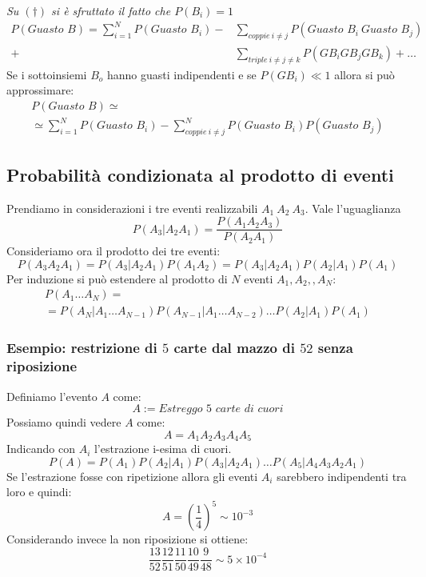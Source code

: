 \documentclass[11pt,a4paper]{book}
\begin{document}
\begin{itemize}
\textit{Su $ (\dag) $ si è sfruttato il fatto che $ P(B_i)=1 $}
\begin{align}
P(\textit{Guasto }B)  = \sum\limits_{i = 1}^{N} P(\textit{Guasto }B_i) -& \sum\limits_{coppie \ i \neq j} P(\textit{Guasto }B_i \ \textit{Guasto }B_j) \\
+& \sum\limits_{triple \ i \neq j \neq k}P(GB_i GB_j GB_k)+ \dots
\end{align}
Se i sottoinsiemi $ B_o $ hanno guasti indipendenti e se $ P(GB_i)\ll1 $ allora si può approssimare:
\begin{multline}
P(\textit{Guasto }B)\simeq \\ \simeq \sum\limits_{i = 1}^{N} P(\textit{Guasto }B_i) - \sum\limits_{coppie \ i \neq j}^{N} P(\textit{Guasto }B_i) P(\textit{Guasto }B_j)
\end{multline}
\end{itemize}
\subsection{Probabilità condizionata al prodotto di eventi} 
Prendiamo in considerazioni i tre eventi realizzabili $ A_1 \ A_2 \ A_3$. Vale l'uguaglianza
\begin{equation}
P(A_3 | A_2 A_1) = \frac{P(A_1 A_2 A_3)}{P(A_2 A_1)}
\end{equation}
Consideriamo ora il prodotto dei tre eventi:
\begin{equation}
P(A_3A_2A_1) = P(A_3 | A_2 A_1) P(A_1A_2) = P(A_3 | A_2 A_1)P(A_2|A_1)P(A_1)
\end{equation}
Per induzione si può estendere al prodotto di $ N $ eventi $ A_1, A_2  ,, A_N $:
\begin{multline}
P(A_1 \dots A_N) =\\
= P(A_N | A_1 \dots A_{N-1})P(A_{N-1}|A_1 \dots A_{N-2})\dots P(A_2|A_1) P(A_1)
\end{multline}
\subsubsection{Esempio: restrizione di $ 5 $ carte dal mazzo di $ 52 $ senza riposizione}
Definiamo l'evento $ A $ come:
\begin{equation}
A := \textit{Estreggo 5 carte di cuori}
\end{equation}
Possiamo quindi vedere $ A $ come:
\begin{equation}
A = A_1A_2A_3A_4A_5
\end{equation}
Indicando con $ A_i $ l'estrazione i-esima di cuori.
\begin{equation}
P(A) = P(A_1)P(A_2|A_1)P(A_3|A_2A_1)\dots P(A_5|A_4A_3A_2A_1)
\end{equation}
Se l'estrazione fosse con ripetizione allora gli eventi $ A_i $ sarebbero indipendenti tra loro e quindi:
\begin{equation}
A = \left( \frac{1}{4}\right)^5 \sim 10^{-3}
\end{equation}
Considerando invece la non riposizione si ottiene:
\begin{equation}
\frac{13}{52}\frac{12}{51}\frac{11}{50}\frac{10}{49}\frac{9}{48} \sim 5 \times 10^{-4}
\end{equation}
\end{document}

